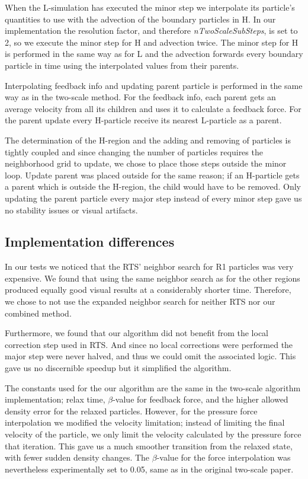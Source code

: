 \documentclass[../../main.tex]{subfiles}
\begin{document}
When the L-simulation has executed the minor step we interpolate its particle's quantities to use with the advection of the boundary particles in H. In our implementation the resolution factor, and therefore \textit{nTwoScaleSubSteps}, is set to 2, so we execute the minor step for H and advection twice. The minor step for H is performed in the same way as for L and the advection forwards every boundary particle in time using the interpolated values from their parents.

Interpolating feedback info and updating parent particle is performed in the same way as in the two-scale method. For the feedback info, each parent gets an average velocity from all its children and uses it to calculate a feedback force. For the parent update every H-particle receive its nearest L-particle as a parent. 

The determination of the H-region and the adding and removing of particles is tightly coupled and since changing the number of particles requires the neighborhood grid to update, we chose to place those steps outside the minor loop. Update parent was placed outside for the same reason; if an H-particle gets a parent which is outside the H-region, the child would have to be removed. Only updating the parent particle every major step instead of every minor step gave us no stability issues or visual artifacts. 


\subsection{Implementation differences}
In our tests we noticed that the RTS' neighbor search for R1 particles was very expensive. We found that using the same neighbor search as for the other regions produced equally good visual results at a considerably shorter time. Therefore, we chose to not use the expanded neighbor search for neither RTS nor our combined method. 

Furthermore, we found that our algorithm did not benefit from the local correction step used in RTS. And since no local corrections were performed the major step were never halved, and thus we could omit the associated logic. This gave us no discernible speedup but it simplified the algorithm. 

The constants used for the our algorithm are the same in the two-scale algorithm implementation; relax time, $\beta$-value for feedback force, and the higher allowed density error for the relaxed particles. However, for the pressure force interpolation we modified the velocity limitation; instead of limiting the final velocity of the particle, we only limit the velocity calculated by the pressure force that iteration. This gave us a much smoother transition from the relaxed state, with fewer sudden density changes. The $\beta$-value for the force interpolation was nevertheless experimentally set to 0.05, same as in the original two-scale paper. 
\end{document}

